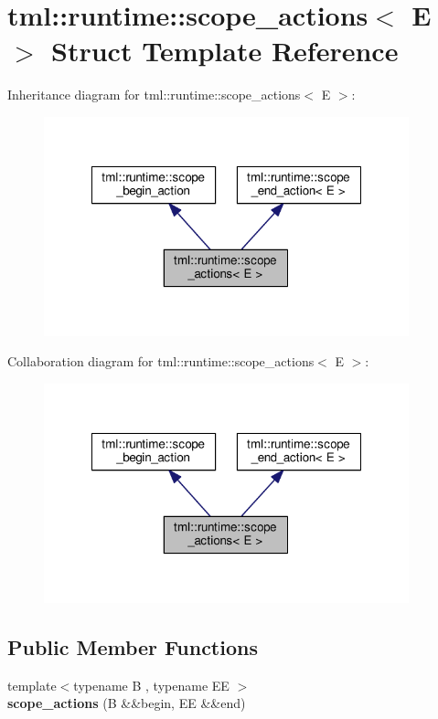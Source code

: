 \hypertarget{structtml_1_1runtime_1_1scope__actions}{\section{tml\+:\+:runtime\+:\+:scope\+\_\+actions$<$ E $>$ Struct Template Reference}
\label{structtml_1_1runtime_1_1scope__actions}
}


Inheritance diagram for tml\+:\+:runtime\+:\+:scope\+\_\+actions$<$ E $>$\+:
\nopagebreak
\begin{figure}[H]
\begin{center}
\leavevmode
\includegraphics[width=299pt]{structtml_1_1runtime_1_1scope__actions__inherit__graph}
\end{center}
\end{figure}


Collaboration diagram for tml\+:\+:runtime\+:\+:scope\+\_\+actions$<$ E $>$\+:
\nopagebreak
\begin{figure}[H]
\begin{center}
\leavevmode
\includegraphics[width=299pt]{structtml_1_1runtime_1_1scope__actions__coll__graph}
\end{center}
\end{figure}
\subsection*{Public Member Functions}
\begin{DoxyCompactItemize}
\item 
\hypertarget{structtml_1_1runtime_1_1scope__actions_a0a4bfd3d1a1e1ce8c88f4d2bad15027f}{{\footnotesize template$<$typename B , typename E\+E $>$ }\\{\bfseries scope\+\_\+actions} (B \&\&begin, E\+E \&\&end)}\label{structtml_1_1runtime_1_1scope__actions_a0a4bfd3d1a1e1ce8c88f4d2bad15027f}

\end{DoxyCompactItemize}


